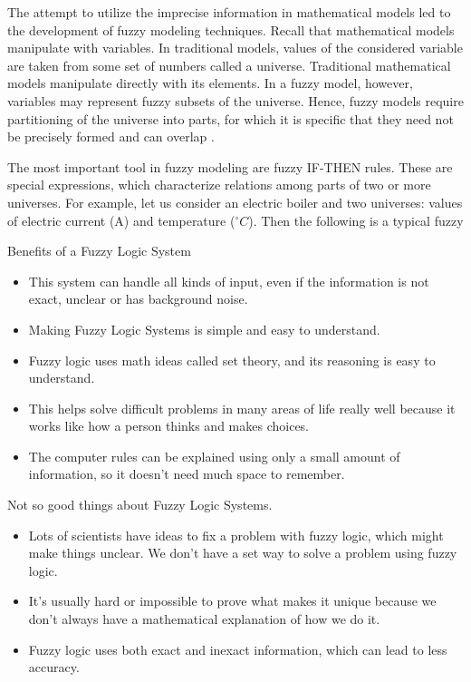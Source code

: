 The attempt to utilize the imprecise information in mathematical models led to the
development of fuzzy modeling techniques. Recall that mathematical models manipulate with variables. In traditional models, values of the considered variable are taken
from some set of numbers called a universe. Traditional mathematical models manipulate directly with its elements. In a fuzzy model, however, variables may represent
fuzzy subsets of the universe. Hence, fuzzy models require partitioning of the universe into parts, for which it is specific that they need not be precisely formed and
can overlap \cite{NOPEDV16}.

The most important tool in fuzzy modeling are fuzzy IF-THEN rules. These are
special expressions, which characterize relations among parts of two or more universes. For example, let us consider an electric boiler and two universes: values
of electric current (A) and temperature  (\(^\circ  C \)). Then the following is a typical fuzzy

Benefits of a Fuzzy Logic System
\begin{itemize}
    \item This system can handle all kinds of input, even if the information is not exact, unclear or has background noise.
\item Making Fuzzy Logic Systems is simple and easy to understand.
\item Fuzzy logic uses math ideas called set theory, and its reasoning is easy to understand.
\item This helps solve difficult problems in many areas of life really well because it works like how a person thinks and makes choices.
\item The computer rules can be explained using only a small amount of information, so it doesn't need much space to remember.
\end{itemize}

Not so good things about Fuzzy Logic Systems.
\begin{itemize}
    \item Lots of scientists have ideas to fix a problem with fuzzy logic, which might make things unclear. We don't have a set way to solve a problem using fuzzy logic.
    \item It's usually hard or impossible to prove what makes it unique because we don't always have a mathematical explanation of how we do it.
\item Fuzzy logic uses both exact and inexact information, which can lead to less accuracy.
\end{itemize}


